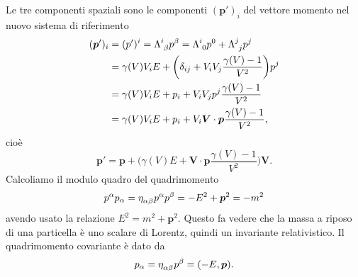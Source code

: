 Le tre componenti spaziali sono le componenti $(\bm{p}')_{i}$ del vettore
momento nel nuovo sistema di riferimento
\begin{equation}
  \begin{split}
    (\bm{p}')_{i} &= (p')^{i} = \tensor{\Lambda}{^{i}_{\beta}}p^{\beta} =
    \tensor{\Lambda}{^{i}_{0}}p^{0} + \tensor{\Lambda}{^{j}_{j}}p^{j} \\
    &= \gamma(V) V_{i}E + \bigg( \delta_{ij} +
    V_{i}V_{j}\frac{\gamma(V)-1}{V^{2}}\bigg)p^{j} \\
    &= \gamma(V) V_{i}E + p_{i} +
    V_{i}V_{j}p^{j}\frac{\gamma(V)-1}{V^{2}} \\
    &= \gamma(V) V_{i}E + p_{i} + V_{i} \bm{V} \cdot \bm{p}
    \frac{\gamma(V)-1}{V^{2}},
  \end{split}
\end{equation}
cioè
\begin{equation}
  \bm{p}' = \bm{p} + \bigg(\gamma(V) E + \bm{V} \cdot \bm{p}
  \frac{\gamma(V)-1}{V^{2}}\bigg)\bm{V}.
\end{equation}
Calcoliamo il modulo quadro del quadrimomento
\begin{equation}
  p^{\alpha}p_{\alpha} = \tensor{\eta}{_{\alpha\beta}}p^{\alpha}p^{\beta} =
  -E^{2} + \bm{p}^{2} = -m^{2}
\end{equation}
avendo usato la relazione $E^{2} = m^{2} + \bm{p}^{2}$.  Questo fa vedere che la
massa a riposo di una particella è uno scalare di Lorentz, quindi un invariante
relativistico.  Il quadrimomento covariante è dato da
\begin{equation}
  p_{\alpha} = \tensor{\eta}{_{\alpha\beta}}p^{\beta} = (-E, \bm{p}).
\end{equation}

